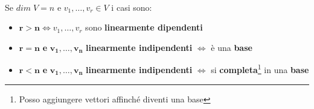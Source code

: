 \documentclass[a4paper, 12pt]{report}
\begin{document}
            \paragraph{}Se $dim \; V=n$ e $v_1,\dots,v_r \in V$ i casi sono:
            \begin{itemize}
                \item $\boldsymbol{r>n} \Leftrightarrow v_1,\dots,v_r$ sono \textbf{linearmente dipendenti}
                \item $\boldsymbol{r=n}$ \textbf{e} $\boldsymbol{v_1,\dots,v_n}$ \textbf{linearmente indipendenti} $\Leftrightarrow$ è una \textbf{base}
                \item $\boldsymbol{r<n}$ \textbf{e} $\boldsymbol{v_1,\dots,v_n}$ \textbf{linearmente indipendenti} $\Leftrightarrow$ si \textbf{completa}\footnote{Posso aggiungere vettori affinché diventi una base} in una \textbf{base}
            \end{itemize}
\end{document}
